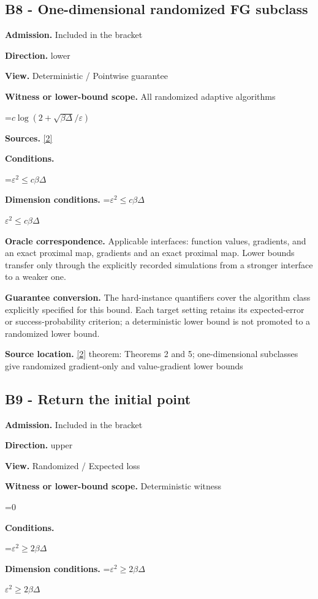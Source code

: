 \documentclass[10pt,a4paper]{article}
\newcommand{\AtlasMath}[1]{\par\begingroup\centering\setbox0=\hbox{$\displaystyle #1$}\ifdim\wd0>1.4\linewidth\typeout{ATLAS WIDE FORMULA: \the\wd0}\fi\ifdim\wd0>\linewidth\resizebox{\linewidth}{!}{\box0}\else\box0\fi\par\endgroup}
\newcommand{\AtlasInlineMath}[1]{\begingroup\setbox0=\hbox{$#1$}\ifdim\wd0>.4\linewidth\endgroup\AtlasMath{#1}\else\endgroup$#1$\fi}
\begin{document}
\subsection{B8 - One-dimensional randomized FG subclass}
\textbf{Admission.} Included in the bracket

\textbf{Direction.} lower

\textbf{View.} Deterministic / Pointwise guarantee

\textbf{Witness or lower-bound scope.} All randomized adaptive algorithms

\AtlasMath{c\log(2+\sqrt{\beta\Delta}/\varepsilon)}
\textbf{Sources.} \href{https://arxiv.org/pdf/2209.07513}{[2]}

\textbf{Conditions.} 
\AtlasMath{\varepsilon^2\le c\beta\Delta}


\textbf{Dimension conditions.} \AtlasInlineMath{\varepsilon^2\le c\beta\Delta}

\textbf{Oracle correspondence.} Applicable interfaces: function values, gradients, and an exact proximal map, gradients and an exact proximal map. Lower bounds transfer only through the explicitly recorded simulations from a stronger interface to a weaker one.

\textbf{Guarantee conversion.} The hard-instance quantifiers cover the algorithm class explicitly specified for this bound. Each target setting retains its expected-error or success-probability criterion; a deterministic lower bound is not promoted to a randomized lower bound.

\textbf{Source location.} \href{https://arxiv.org/pdf/2209.07513}{[2]} theorem: Theorems 2 and 5; one-dimensional subclasses give randomized gradient-only and value-gradient lower bounds

\subsection{B9 - Return the initial point}
\textbf{Admission.} Included in the bracket

\textbf{Direction.} upper

\textbf{View.} Randomized / Expected loss

\textbf{Witness or lower-bound scope.} Deterministic witness

\AtlasMath{0}
\textbf{Conditions.} 
\AtlasMath{\varepsilon^2\ge2\beta\Delta}


\textbf{Dimension conditions.} \AtlasInlineMath{\varepsilon^2\ge2\beta\Delta}
\end{document}
